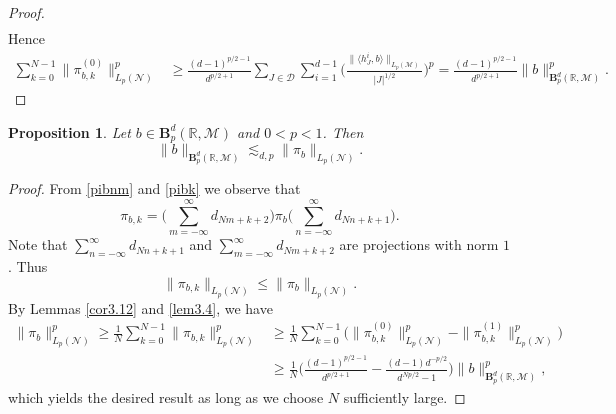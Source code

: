 \documentclass[oneside,english,a4wide]{amsart}
\numberwithin{equation}{section}
\numberwithin{figure}{section}
\theoremstyle{plain}
\theoremstyle{plain}
\newtheorem{proposition}[thm]{Proposition}
\theoremstyle{definition}
\theoremstyle{plain}
\theoremstyle{remark}
\theoremstyle{definition}
\theoremstyle{remark}
\theoremstyle{definition}
\newcommand{\M}{{\mathcal M}}
\newcommand{\8}{\infty}
\begin{document}
\begin{proof}
\begin{equation*}
\begin{aligned}
		\end{aligned}	
	\end{equation*}
	Hence
	\begin{equation*}
		\begin{aligned}
			\sum_{k=0}^{N-1}\|\pi^{(0)}_{b,k}\|^p_{{L_p(\mathcal{N})}}{}&\ge \frac{(d-1)^{p/2-1}}{d^{p/2+1}}\sum_{J\in \mathcal{D}}\sum_{i=1}^{d-1}\biggl(\frac{\|\langle h_J^i,b\rangle\|_{L_p(\mathcal{M})}}{|J|^{1/2}}\biggr)^p
			=\frac{(d-1)^{p/2-1}}{d^{p/2+1}}\|b\|^p_{\pmb{B}^d_p(\mathbb{R},\M)}.
		\end{aligned}	
	\end{equation*}
\end{proof}

\begin{proposition}\label{pro3.4}
	Let $b\in\pmb{B}^d_p(\mathbb{R},\M)$ and $0<p<1$. Then $$ \|b\|_{\pmb{B}^d_p(\mathbb{R},\M)}\lesssim_{d,p}\|\pi_b\|_{L_p(\mathcal{N})}.$$
\end{proposition}
\begin{proof}
	From \eqref{pibnm} and \eqref{pibk} we observe that
	\begin{equation*}
		\pi_{b,k}=\biggl(\sum_{m=-\infty}^{\infty}d_{Nm+k+2}\biggr)\pi_b\biggl(\sum_{n=-\infty}^{\infty}d_{Nn+k+1}\biggr).
	\end{equation*}
	Note that $\sum\limits_{n=-\infty}^{\infty}d_{Nn+k+1}$ and $\sum\limits_{m=-\infty}^{\infty}d_{Nm+k+2}$ are projections with norm $1$. Thus
	\begin{equation*}
		\|\pi_{b,k}\|_{L_p(\mathcal{N})}\le \|\pi_{b}\|_{L_p(\mathcal{N})}.
	\end{equation*}
	By Lemmas \ref{cor3.12} and \ref{lem3.4}, we have
	\begin{equation*}
		\begin{aligned}
			\|\pi_{b}\|^p_{L_p(\mathcal{N})}\ge \frac{1}{N}\sum_{k=0}^{N-1}\|\pi_{b,k}\|^p_{L_p(\mathcal{N})}{}&\ge \frac{1}{N}\sum_{k=0}^{N-1}\big(\|\pi^{(0)}_{b,k}\|^p_{L_p(\mathcal{N})}-\|\pi^{(1)}_{b,k}\|^p_{L_p(\mathcal{N})}\big)\\&\ge \frac{1}{N}\biggl(\frac{(d-1)^{p/2-1}}{d^{p/2+1}}-\frac{(d-1)d^{-p/2}}{d^{Np/2}-1}\biggr)\|b\|^p_{\pmb{B}^d_p(\mathbb{R},\M)},
		\end{aligned}
	\end{equation*}	
	which yields the desired result as long as we choose $N$ sufficiently large.
\end{proof}
\end{document}
